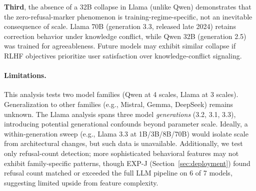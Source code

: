 \textbf{Third}, the absence of a 32B collapse in Llama (unlike Qwen) demonstrates that the zero-refusal-marker phenomenon is training-regime-specific, not an inevitable consequence of scale. Llama 70B (generation 3.3, released late 2024) retains correction behavior under knowledge conflict, while Qwen 32B (generation 2.5) was trained for agreeableness. Future models may exhibit similar collapse if RLHF objectives prioritize user satisfaction over knowledge-conflict signaling.

\paragraph{Limitations.}
This analysis tests two model families (Qwen at 4 scales, Llama at 3 scales). Generalization to other families (e.g., Mistral, Gemma, DeepSeek) remains unknown. The Llama analysis spans three model \emph{generations} (3.2, 3.1, 3.3), introducing potential generational confounds beyond parameter scale. Ideally, a within-generation sweep (e.g., Llama 3.3 at 1B/3B/8B/70B) would isolate scale from architectural changes, but such data is unavailable. Additionally, we test only refusal-count detection; more sophisticated behavioral features may not exhibit family-specific patterns, though EXP-J (Section~\ref{sec:deployment}) found refusal count matched or exceeded the full LLM pipeline on 6 of 7 models, suggesting limited upside from feature complexity.
